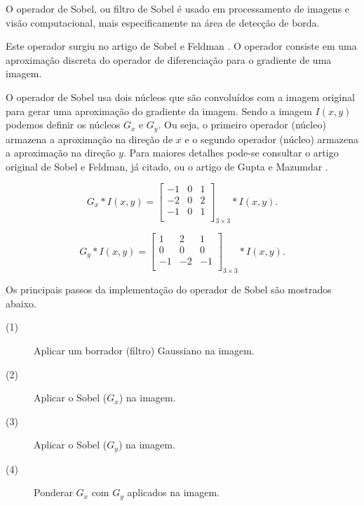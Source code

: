 \documentclass[a4paper]{article} %
\begin{document}
O operador de Sobel, ou filtro de  Sobel é usado em processamento de imagens e visão computacional, mais especificamente na área de detecção de borda.

 Este operador surgiu no artigo de Sobel e Feldman \cite{sobel1968}. O operador consiste em uma aproximação discreta do operador de diferenciação para o gradiente de uma imagem.                 


O operador de Sobel usa dois núcleos que são convoluídos com a imagem original para gerar uma aproximação do gradiente da imagem. Sendo a imagem $I(x, y)$ podemos definir os núcleos $G_x$ e $G_y$. Ou seja, o primeiro operador (núcleo) armazena a aproximação na direção de $x$ e o segundo operador (núcleo) armazena a aproximação na direção $y$. Para maiores detalhes pode-se consultar o artigo original de Sobel e Feldman, já citado, ou o artigo de Gupta e Mazumdar \cite{gupta2013sobel}.  


$$G_x* I(x,y)=\left[
\begin{array}{lll}
-1 & 0 & 1\\
-2 & 0 & 2\\
-1 & 0 & 1\\
\end{array}
\right]_{3 \times 3}* I(x,y).$$

$$G_y* I(x,y)=\left[
\begin{array}{rrr}
 1 &  2 &  1\\
 0 &  0 &  0\\
-1 & -2 & -1\\
\end{array}
\right]_{3 \times 3}* I(x,y).$$

Os principais passos da implementação do operador de Sobel são mostrados abaixo.

\begin{description}
\item[(1)] Aplicar um borrador (filtro) Gaussiano na imagem.
\item[(2)] Aplicar o Sobel ($G_x$) na imagem.
\item[(3)] Aplicar o Sobel ($G_y$) na imagem.
\item[(4)] Ponderar $G_x$ com $G_y$ aplicados na imagem.
\end{description}
\end{document}
